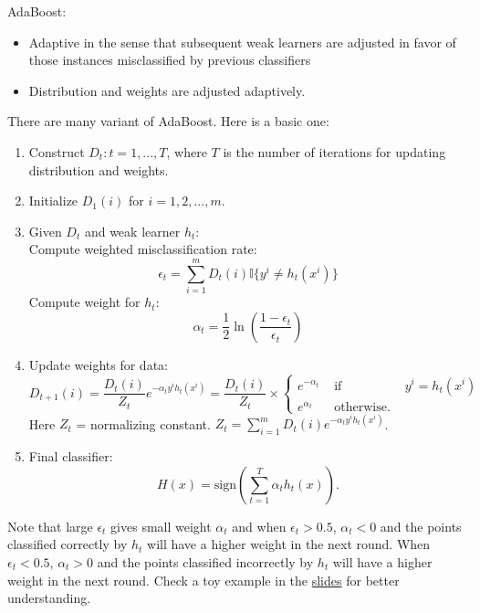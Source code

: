 \documentclass[twoside,12pt]{article}
\begin{document}
AdaBoost: 
\begin{itemize}
\item Adaptive in the sense that subsequent weak learners are adjusted in favor of those instances misclassified by previous classifiers
\item Distribution and weights are adjusted adaptively. 
\end{itemize}
There are many variant of AdaBoost. Here is a basic one:
\begin{enumerate}
\item Construct $D_t: t = 1, ..., T$, where $T$ is the number of iterations for updating distribution and weights. 
\item Initialize $D_1(i)$ for $i = 1, 2, ..., m.$
\item Given $D_t$ and weak learner $h_t$: \\
Compute weighted misclassification rate: $$\epsilon_t = \sum_{i=1}^m D_t(i) \mathbb{I}\{ y^i \neq h_t(x^i) \} $$ 
Compute weight for $h_t$: $$\alpha_t = \frac 1 2 \ln( \frac{1 - \epsilon_t}{\epsilon_t} )$$

\item Update weights for data: \\
$$D_{t+1}(i) = \frac{D_t(i)}{Z_t} e^{-\alpha_t y^i h_t(x^i)} = \frac{D_t(i)}{Z_t} \times  \left\{ \begin{array}{lcr} e^{-\alpha_t} & \mbox{ if }  & y^i = h_t(x^i) \\ e^{\alpha_t} &\mbox{ otherwise. }&\end{array}\right. $$
Here $Z_t$ = normalizing constant. $Z_t = \sum_{i=1}^m D_t(i) e^{-\alpha_t y^i h_t(x^i)}$. 

\item Final classifier: $$H(x) = \text{sign}(\sum_{t=1}^T \alpha_t h_t(x)).$$
\end{enumerate}
Note that large $\epsilon_t$ gives small weight $\alpha_t$ and when $\epsilon_t > 0.5$, $\alpha_t < 0$ and the points classified correctly by $h_t$ will have a higher weight in the next round. When $\epsilon_t < 0.5$, $\alpha_t > 0$ and the points classified incorrectly by $h_t$ will have a higher weight in the next round. Check a toy example in the  \href{https://github.com/sliao7/CSE6740\_Computational\_Data\_Analysis/blob/main/slides/boosting.pdf}{slides} for better understanding. \\
\end{document}
